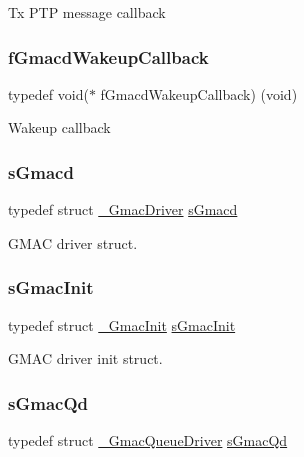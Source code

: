 Tx P\+TP message callback \mbox{\label{group__gmacd__types_ga44e6be4bb53db0660baf6cb50b20a684}} 
\subsubsection{\texorpdfstring{fGmacdWakeupCallback}{fGmacdWakeupCallback}}
{\footnotesize\ttfamily typedef void($\ast$ f\+Gmacd\+Wakeup\+Callback) (void)}

Wakeup callback \mbox{\label{group__gmacd__types_gaa8760917079000a5ee7fbc7fab992dd3}} 
\subsubsection{\texorpdfstring{sGmacd}{sGmacd}}
{\footnotesize\ttfamily typedef struct \mbox{\hyperlink{struct__GmacDriver}{\+\_\+\+Gmac\+Driver}}  \mbox{\hyperlink{group__gmacd__types_gaa8760917079000a5ee7fbc7fab992dd3}{s\+Gmacd}}}

G\+M\+AC driver struct. \mbox{\label{group__gmacd__types_ga5ab53aef1a598e4d862677f8f1928b20}} 
\subsubsection{\texorpdfstring{sGmacInit}{sGmacInit}}
{\footnotesize\ttfamily typedef struct \mbox{\hyperlink{struct__GmacInit}{\+\_\+\+Gmac\+Init}}  \mbox{\hyperlink{group__gmacd__types_ga5ab53aef1a598e4d862677f8f1928b20}{s\+Gmac\+Init}}}

G\+M\+AC driver init struct. \mbox{\label{group__gmacd__types_gaf703cfd044c83739379ae7ce3b9cbac5}} 
\subsubsection{\texorpdfstring{sGmacQd}{sGmacQd}}
{\footnotesize\ttfamily typedef struct \mbox{\hyperlink{struct__GmacQueueDriver}{\+\_\+\+Gmac\+Queue\+Driver}}  \mbox{\hyperlink{group__gmacd__types_gaf703cfd044c83739379ae7ce3b9cbac5}{s\+Gmac\+Qd}}}

